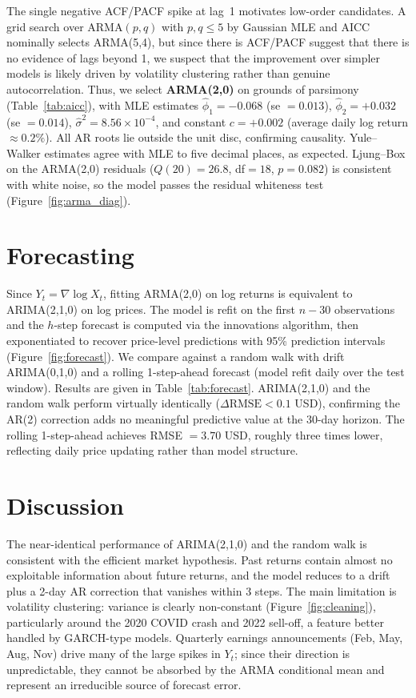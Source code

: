\documentclass[11pt,a4paper]{article}
\begin{document}
The single negative ACF/PACF spike at lag~1 motivates low-order candidates.
A grid search over ARMA$(p,q)$ with $p,q\leq 5$ by Gaussian MLE
and AICC nominally selects ARMA(5,4), but since there is ACF/PACF suggest that there is no evidence of lags beyond 1, we suspect that the improvement over simpler models is likely driven by volatility clustering rather than genuine autocorrelation.
Thus, we select \textbf{ARMA(2,0)} on grounds of parsimony (Table~\ref{tab:aicc}), with MLE estimates
$\hat\phi_1 = -0.068$ (se $= 0.013$),
$\hat\phi_2 = +0.032$ (se $= 0.014$),
$\hat\sigma^2 = 8.56\times10^{-4}$,
and constant $c = +0.002$ (average daily log return $\approx 0.2\%$).
All AR roots lie outside the unit disc, confirming causality.
Yule--Walker estimates agree with MLE to five decimal places, as expected.
Ljung--Box on the ARMA(2,0) residuals ($Q(20)=26.8$, df$=18$, $p=0.082$)
is consistent with white noise, so the model passes the residual whiteness test
(Figure~\ref{fig:arma_diag}).

\section{Forecasting}

Since $Y_t = \nabla\log X_t$, fitting ARMA(2,0) on log returns is equivalent to
ARIMA(2,1,0) on log prices.
The model is refit on the first $n-30$ observations and the $h$-step forecast
is computed via the innovations algorithm, then exponentiated
to recover price-level predictions with 95\% prediction intervals
(Figure~\ref{fig:forecast}).
We compare against a random walk with drift ARIMA(0,1,0) and a rolling
1-step-ahead forecast (model refit daily over the test window).
Results are given in Table~\ref{tab:forecast}.
ARIMA(2,1,0) and the random walk perform virtually identically
($\Delta\text{RMSE}<0.1$ USD), confirming the AR(2) correction adds
no meaningful predictive value at the 30-day horizon.
The rolling 1-step-ahead achieves RMSE $= 3.70$ USD, roughly three times lower,
reflecting daily price updating rather than model structure.

\section{Discussion}

The near-identical performance of ARIMA(2,1,0) and the random walk is consistent
with the efficient market hypothesis. Past returns contain almost no exploitable
information about future returns, and the model reduces to a drift plus a 2-day
AR correction that vanishes within 3 steps.
The main limitation is volatility clustering: variance is clearly non-constant
(Figure~\ref{fig:cleaning}), particularly around the 2020 COVID crash and 2022
sell-off, a feature better handled by GARCH-type models.
Quarterly earnings announcements (Feb, May, Aug, Nov) drive many of the large
spikes in $Y_t$; since their direction is unpredictable, they cannot be absorbed
by the ARMA conditional mean and represent an irreducible source of forecast error.
\end{document}

